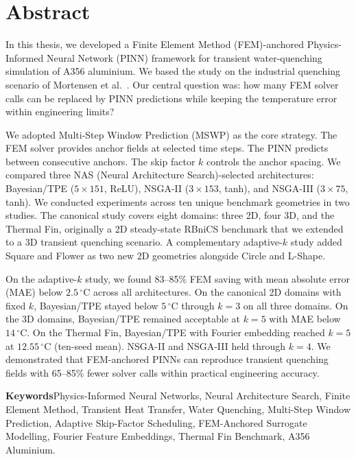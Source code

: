 \chapter*{Abstract}

In this thesis, we developed a Finite Element Method (FEM)-anchored
Physics-Informed Neural Network (PINN) framework for transient water-quenching
simulation of A356 aluminium.
We based the study on the industrial quenching scenario of Mortensen
et al.~\cite{mortensen2026}.
Our central question was: how many FEM solver calls can be replaced by PINN
predictions while keeping the temperature error within engineering limits?

We adopted Multi-Step Window Prediction (MSWP) as the core strategy.
The FEM solver provides anchor fields at selected time steps.
The PINN predicts between consecutive anchors.
The skip factor $k$ controls the anchor spacing.
We compared three NAS (Neural Architecture Search)-selected architectures:
Bayesian/TPE ($5{\times}151$, ReLU), NSGA-II ($3{\times}153$, tanh), and
NSGA-III ($3{\times}75$, tanh).
We conducted experiments across ten unique benchmark geometries in two studies.
The canonical study covers eight domains: three 2D, four 3D, and the Thermal
Fin, originally a 2D steady-state RBniCS benchmark that we extended to a 3D
transient quenching scenario.
A complementary adaptive-$k$ study added Square and Flower as two new 2D
geometries alongside Circle and L-Shape.

On the adaptive-$k$ study, we found 83--85\% FEM saving with mean absolute
error (MAE) below $2.5\,^\circ\mathrm{C}$ across all architectures.
On the canonical 2D domains with fixed $k$, Bayesian/TPE stayed below
$5\,^\circ\mathrm{C}$ through $k=3$ on all three domains.
On the 3D domains, Bayesian/TPE remained acceptable at $k=5$ with MAE below
$14\,^\circ\mathrm{C}$.
On the Thermal Fin, Bayesian/TPE with Fourier embedding reached $k=5$ at
$12.55\,^\circ\mathrm{C}$ (ten-seed mean).
NSGA-II and NSGA-III held through $k=4$.
We demonstrated that FEM-anchored PINNs can reproduce transient quenching
fields with 65--85\% fewer solver calls within practical engineering accuracy.

\vspace{0.15cm}
\noindent\textbf{Keywords}\quad Physics-Informed Neural Networks, Neural Architecture Search, Finite Element Method, Transient Heat Transfer, Water Quenching, Multi-Step Window Prediction, Adaptive Skip-Factor Scheduling, FEM-Anchored Surrogate Modelling, Fourier Feature Embeddings, Thermal Fin Benchmark, A356 Aluminium.
